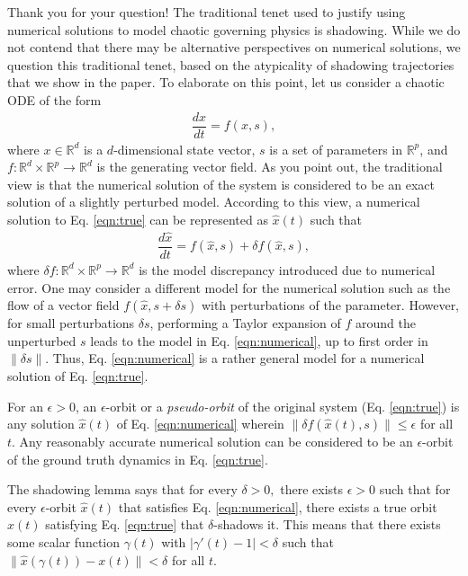 \documentclass[11pt]{article}
\begin{document}
Thank you for your question! The traditional tenet used to justify using numerical solutions to model chaotic governing physics is shadowing. While we do not contend that there may be alternative perspectives on numerical solutions, we question this traditional tenet, based on the atypicality of shadowing trajectories that we show in the paper. To elaborate on this point, let us consider a chaotic ODE of the form 
\begin{align}
\label{eqn:true}
    \dfrac{d x}{dt} = f(x, s),
\end{align}
where $x \in \mathbb{R}^d$ is a $d$-dimensional state vector, $s$ is a set of
parameters in $\mathbb{R}^p$, and $f:\mathbb{R}^d \times \mathbb{R}^p \to \mathbb{R}^d$ is the generating vector field. As you point out, the traditional view is that the numerical solution of the system is considered to be an exact solution of a slightly perturbed model. According to this view, a numerical solution to Eq. \ref{eqn:true} can be represented as $\hat{x}(t)$ such that 
\begin{align}
\label{eqn:numerical}
    \dfrac{d\hat{x}}{dt} = f(\hat{x}, s) + \delta f(\hat{x},s), 
\end{align}
where $\delta f:\mathbb{R}^d \times \mathbb{R}^p \to \mathbb{R}^d$ is the model discrepancy introduced due to numerical error. One may consider a different model for the numerical solution such as the flow of a vector field $f(\hat{x}, s + \delta s)$ with perturbations of the parameter. However, for small perturbations $\delta s$, performing a Taylor expansion of $f$ around the unperturbed $s$ leads to the model in Eq. \ref{eqn:numerical}, up to first order in $\|\delta s\|$. Thus, Eq. \ref{eqn:numerical} is a rather general model for a numerical solution of Eq. \ref{eqn:true}.

For an $\epsilon >0$, an $\epsilon$-orbit or a {\em pseudo-orbit} of the original system (Eq. \ref{eqn:true}) is any solution $\hat{x}(t)$ of Eq. \ref{eqn:numerical} wherein $\|\delta f(\hat{x}(t), s)\| \leq \epsilon$ for all $t$. Any reasonably accurate numerical solution can be considered to be an $\epsilon$-orbit of the ground truth dynamics in Eq. \ref{eqn:true}.

The shadowing lemma says that for every $\delta > 0,$ there exists $\epsilon > 0$ such that for every $\epsilon$-orbit $\hat{x}(t)$ that satisfies Eq. \ref{eqn:numerical}, there exists a true orbit $x(t)$ satisfying Eq. \ref{eqn:true} that $\delta$-shadows it. This means that there exists some scalar function $\gamma(t)$ with $|\gamma'(t) - 1| < \delta$ such that $\| \hat{x}(\gamma(t)) - x(t) \| < \delta$ for all $t.$
\end{document}
